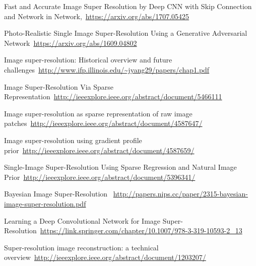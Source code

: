 {}
\begin{thebibliography}{99}

\bibitem{}Fast and Accurate Image Super Resolution by Deep CNN with Skip Connection and Network in Network,\ \url{https://arxiv.org/abs/1707.05425}

\bibitem{} Photo-Realistic Single Image Super-Resolution Using a Generative Adversarial Network\ \url{https://arxiv.org/abs/1609.04802}

\bibitem{}Image super-resolution: Historical overview
and future challenges\ \url{http://www.ifp.illinois.edu/~jyang29/papers/chap1.pdf}


\bibitem{}Image Super-Resolution Via Sparse Representation\ \url{http://ieeexplore.ieee.org/abstract/document/5466111}

\bibitem{}Image super-resolution as sparse representation of raw image patches\ \url{http://ieeexplore.ieee.org/abstract/document/4587647/}

\bibitem{}Image super-resolution using gradient profile prior\ \url{http://ieeexplore.ieee.org/abstract/document/4587659/}

\bibitem{}Single-Image Super-Resolution Using Sparse Regression and Natural Image Prior\ \url{http://ieeexplore.ieee.org/abstract/document/5396341/}

\bibitem{}Bayesian Image Super-Resolution \ \url{http://papers.nips.cc/paper/2315-bayesian-image-super-resolution.pdf}

\bibitem{}Learning a Deep Convolutional Network for Image Super-Resolution\ \url{https://link.springer.com/chapter/10.1007/978-3-319-10593-2_13}

\bibitem{}Super-resolution image reconstruction: a technical overview\ \url{http://ieeexplore.ieee.org/abstract/document/1203207/}

\end{thebibliography}
